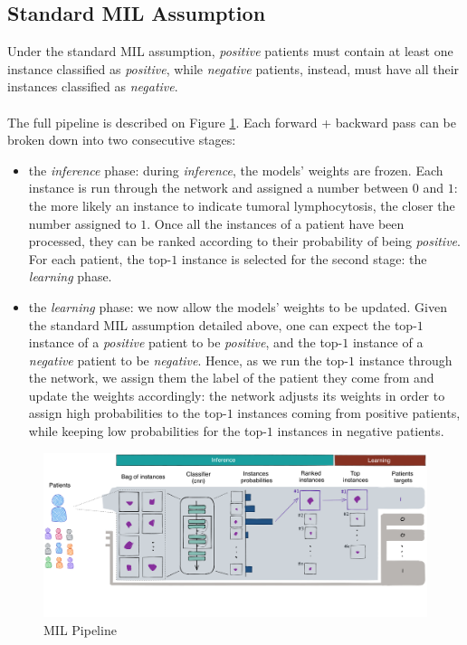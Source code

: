 \documentclass[final]{cvpr}
\begin{document}
	\subsection{Standard MIL Assumption}
	\label{standardMIL}
	
	Under the standard MIL assumption, \emph{positive} patients must contain at least one instance classified as \emph{positive}, while \emph{negative} patients, instead, must have all their instances classified as \emph{negative}.\\
	\\
	The full pipeline is described on Figure \ref{fig:mil_pipeline}. Each forward + backward pass can be broken down into two consecutive stages: 
	
	\begin{itemize}
		\setlength\itemsep{-.0em}
		\item the \emph{inference} phase: during \emph{inference}, the models' weights are frozen. Each instance is run through the network and assigned a number between $0$ and $1$: the more likely an instance to indicate tumoral lymphocytosis, the closer the number assigned to $1$. Once all the instances of a patient have been processed, they can be ranked according to their probability of being \emph{positive}. For each patient, the top-$1$ instance is selected for the second stage: the \emph{learning} phase.
		\item the \emph{learning} phase: we now allow the models' weights to be updated. Given the standard MIL assumption detailed above, one can expect the top-$1$ instance of a \emph{positive} patient to be \emph{positive}, and the top-$1$ instance of a \emph{negative} patient to be \emph{negative}. Hence, as we run the top-$1$ instance through the network, we assign them the label of the patient they come from and update the weights accordingly: the network adjusts its weights in order to assign high probabilities to the top-$1$ instances coming from positive patients, while keeping low probabilities for the top-$1$ instances in negative patients. 
	\end{itemize}

	\begin{figure}[h!]
		\begin{center}
			\includegraphics[width=0.99\linewidth, trim=0cm 5cm 0cm 0cm, clip]{fig/mil_pipeline.pdf}
		\end{center}
		\caption{MIL Pipeline}
		\label{fig:mil_pipeline}
	\end{figure}
\end{document}
